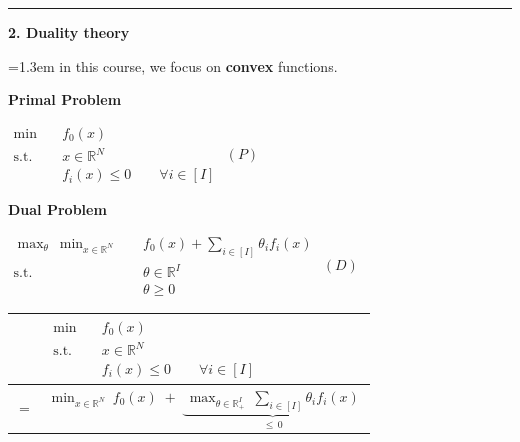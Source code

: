 \documentclass[10pt]{article}
\newcommand{\beat}[2]{%
  \par\bigskip\vspace{4pt}
  {\color{ruleink}\rule{\textwidth}{1pt}}\par\nobreak\vspace{4pt}
  {\large\bfseries #1.\; #2}\par\nobreak\vspace{6pt}}
\newenvironment{board}{%
  \par\vspace{4pt}
  \begingroup\leftskip=1.3em\relax\parskip=2pt\relax}{%
  \par\endgroup\vspace{4pt}}
\begin{document}
\newpage
\beat{2}{Duality theory}
\begin{board}
in this course, we focus on \textbf{convex} functions.
\vspace{10pt}

\textbf{Primal Problem}
\vspace{2pt}

\begin{center}
$\begin{aligned}
  \min\quad & f_0(x) \\
  \text{s.t.}\quad & x \in \mathbb{R}^N \\
                   & f_i(x) \le 0 \qquad \forall i \in [I]
\end{aligned}$
\hspace{4.5cm} $(P)$
\end{center}
\vspace{10pt}

\textbf{Dual Problem}
\vspace{2pt}

\begin{center}
$\begin{aligned}
  \max_{\theta}\ \min_{x \in \mathbb{R}^N}\quad & f_0(x) + \sum_{i \in [I]} \theta_i f_i(x) \\
  \text{s.t.}\quad & \theta \in \mathbb{R}^I \\
                   & \theta \ge 0
\end{aligned}$
\hspace{4.0cm} $(D)$
\end{center}
\vspace{12pt}

\begin{center}
{\setlength{\arrayrulewidth}{1pt}
\begin{tabular}{|@{\;}c@{\;\;}l@{\;}|}
\hline
\rule{0pt}{4.6em}
 & $\begin{aligned}
      \min\quad & f_0(x) \\
      \text{s.t.}\quad & x \in \mathbb{R}^N \\
                       & f_i(x) \le 0 \qquad \forall i \in [I]
   \end{aligned}$ \\[1.4em]
\hline
\rule{0pt}{3.6em}
$=$ &
 $\displaystyle \min_{x \in \mathbb{R}^N}\ f_0(x)
   \;+\; \underbrace{\ \max_{\theta \in \mathbb{R}^I_+}\ \sum_{i \in [I]} \theta_i f_i(x)\ }_{\textstyle \le\, 0}$ \\[2.6em]
\hline
\end{tabular}}
\end{center}
\vspace{4pt}


\end{board}
\end{document}

